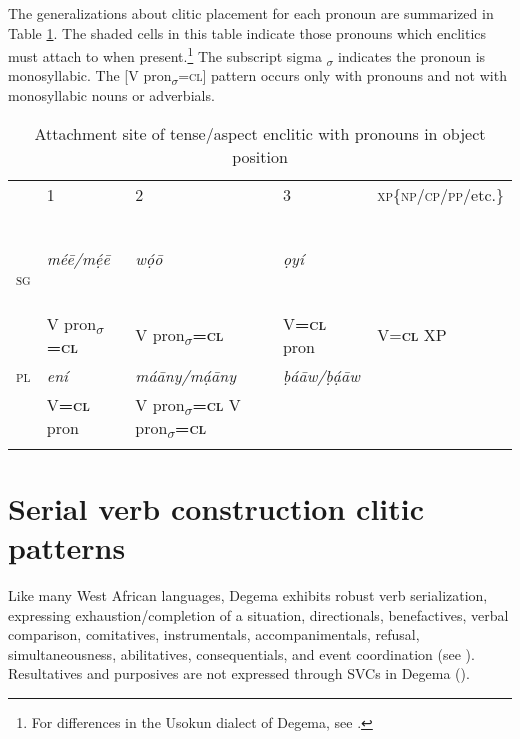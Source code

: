 \documentclass[output=paper]{langsci/langscibook}
\begin{document}
The generalizations about clitic placement for each pronoun are summarized in Table \ref{table:2}. The shaded cells in this table indicate those pronouns which enclitics must attach to when present.\footnote{For differences in the Usokun dialect of Degema, see \citet{Offah2000}.} 
The subscript sigma \textsubscript{$\sigma $} indicates the pronoun is monosyllabic. The [V pron\textsubscript{$\sigma $}=\textsc{cl}] pattern occurs only with pronouns and not with monosyllabic nouns or adverbials.

\begin{table}
\caption{Attachment site of tense/aspect enclitic with pronouns in object position}
\label{table:2}

\begin{tabularx}{\textwidth}{XXXXX}
& {1} & {2} & {3} & {\textsc{xp\{np/cp/pp/}etc.\}}\\\
\lsptoprule

{\scshape sg} & {\itshape méē/mẹ́ē} & {\itshape wọ́ō}  & {\itshape ọyí} & { }\\

& {V pron\textsubscript{$\sigma $}\textbf{\textsc{=cl}}} & {V pron\textsubscript{$\sigma $}\textbf{=}\textbf{\textsc{cl}}} & {V\textbf{=}\textbf{\textsc{cl}} pron} & {V=\textbf{\textsc{cl}} XP}\\

{\scshape pl} & {\itshape ení}  & {\itshape máāny/mạ́āny} & {\itshape ḅáāw/ḅạ́āw} & { } \\

&  {V\textbf{=}\textbf{\textsc{cl}} pron} & {V pron\textsubscript{$\sigma $}\textbf{=}\textbf{\textsc{cl}}} {V pron\textsubscript{$\sigma $}\textbf{=}\textbf{\textsc{cl}}} & { } \\

\lspbottomrule
\end{tabularx}
\end{table}

\section{Serial verb construction clitic patterns}

Like many West African languages, Degema exhibits robust verb serialization, expressing exhaustion/completion of a situation, directionals, benefactives, verbal comparison, comitatives, instrumentals, accompanimentals, refusal, simultaneousness, abilitatives, consequentials, and event coordination (see \citealt{Kari2003a}). Resultatives and purposives are not expressed through SVCs in Degema (\citealt[59--60, 206]{Kari2004}).
\end{document}
